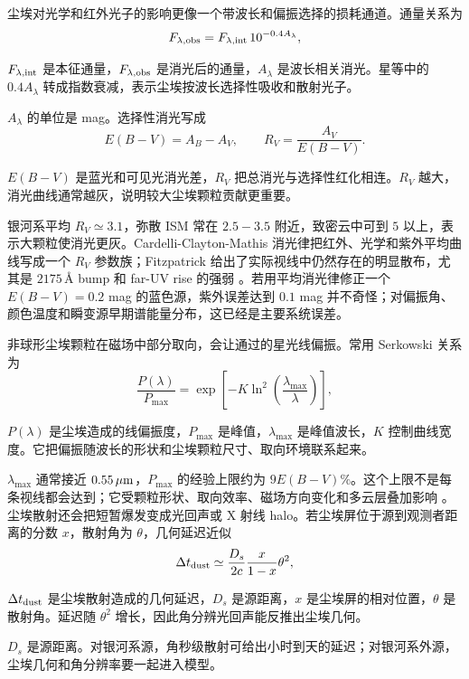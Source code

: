 尘埃对光学和红外光子的影响更像一个带波长和偏振选择的损耗通道。通量关系为
\begin{equation}
  F_{\lambda,{\rm obs}}
  =
  F_{\lambda,{\rm int}}\,10^{-0.4A_\lambda},
  \label{eq:ch14-extinction-flux}
\end{equation}
\begin{formulaexplain}[公式 (14.16) 解读]
\(F_{\lambda,{\rm int}}\) 是本征通量，\(F_{\lambda,{\rm obs}}\) 是消光后的通量，\(A_\lambda\) 是波长相关消光。星等中的 \(0.4A_\lambda\) 转成指数衰减，表示尘埃按波长选择性吸收和散射光子。
\end{formulaexplain}
\(A_\lambda\) 的单位是 mag。选择性消光写成
\begin{equation}
  E(B-V)=A_B-A_V,
  \qquad
  R_V=\frac{A_V}{E(B-V)}.
  \label{eq:ch14-rv-definition}
\end{equation}
\begin{formulaexplain}[公式 (14.17) 解读]
\(E(B-V)\) 是蓝光和可见光消光差，\(R_V\) 把总消光与选择性红化相连。\(R_V\) 越大，消光曲线通常越灰，说明较大尘埃颗粒贡献更重要。
\end{formulaexplain}
银河系平均 \(R_V\simeq3.1\)，弥散 ISM 常在 \(2.5-3.5\) 附近，致密云中可到 \(5\) 以上，表示大颗粒使消光更灰。Cardelli-Clayton-Mathis 消光律把红外、光学和紫外平均曲线写成一个 \(R_V\) 参数族；Fitzpatrick 给出了实际视线中仍然存在的明显散布，尤其是 \(2175\,\text{\AA}\) bump 和 far-UV rise 的强弱 \citep{1989ApJ...345..245C,1999PASP..111...63F,2003ARA&A..41..241D}。若用平均消光律修正一个 \(E(B-V)=0.2\) mag 的蓝色源，紫外误差达到 \(0.1\) mag 并不奇怪；对偏振角、颜色温度和瞬变源早期谱能量分布，这已经是主要系统误差。

非球形尘埃颗粒在磁场中部分取向，会让通过的星光线偏振。常用 Serkowski 关系为
\begin{equation}
  \frac{P(\lambda)}{P_{\max}}
  =
  \exp\!\left[-K\ln^2\!\left(\frac{\lambda_{\max}}{\lambda}\right)\right],
  \label{eq:ch14-serkowski}
\end{equation}
\begin{formulaexplain}[公式 (14.18) 解读]
\(P(\lambda)\) 是尘埃造成的线偏振度，\(P_{\max}\) 是峰值，\(\lambda_{\max}\) 是峰值波长，\(K\) 控制曲线宽度。它把偏振随波长的形状和尘埃颗粒尺寸、取向环境联系起来。
\end{formulaexplain}
\(\lambda_{\max}\) 通常接近 \(0.55\,\mu{\rm m}\)，\(P_{\max}\) 的经验上限约为 \(9E(B-V)\%\)。这个上限不是每条视线都会达到；它受颗粒形状、取向效率、磁场方向变化和多云层叠加影响 \citep{1975ApJ...196..261S,2015ARA&A..53..501A}。尘埃散射还会把短暂爆发变成光回声或 X 射线 halo。若尘埃屏位于源到观测者距离的分数 \(x\)，散射角为 \(\theta\)，几何延迟近似
\begin{equation}
  \Delta t_{\rm dust}
  \simeq
  \frac{D_s}{2c}\frac{x}{1-x}\theta^2 ,
  \label{eq:ch14-dust-delay}
\end{equation}
\begin{formulaexplain}[公式 (14.19) 解读]
\(\Delta t_{\rm dust}\) 是尘埃散射造成的几何延迟，\(D_s\) 是源距离，\(x\) 是尘埃屏的相对位置，\(\theta\) 是散射角。延迟随 \(\theta^2\) 增长，因此角分辨光回声能反推出尘埃几何。
\end{formulaexplain}
\(D_s\) 是源距离。对银河系源，角秒级散射可给出小时到天的延迟；对银河系外源，尘埃几何和角分辨率要一起进入模型。

